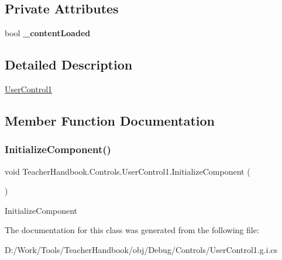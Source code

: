 \subsection*{Private Attributes}
\begin{DoxyCompactItemize}
\item 
\mbox{\label{class_teacher_handbook_1_1_controls_1_1_user_control1_a57070769f7910e144693661a022177be}} 
bool {\bfseries \+\_\+content\+Loaded}
\end{DoxyCompactItemize}


\subsection{Detailed Description}
\mbox{\hyperlink{class_teacher_handbook_1_1_controls_1_1_user_control1}{User\+Control1}} 



\subsection{Member Function Documentation}
\mbox{\label{class_teacher_handbook_1_1_controls_1_1_user_control1_afbcb7046a6000b1f69c161bb9e5c69b2}} 
\subsubsection{\texorpdfstring{Initialize\+Component()}{InitializeComponent()}}
{\footnotesize\ttfamily void Teacher\+Handbook.\+Controls.\+User\+Control1.\+Initialize\+Component (\begin{DoxyParamCaption}{ }\end{DoxyParamCaption})}



Initialize\+Component 



The documentation for this class was generated from the following file\+:\begin{DoxyCompactItemize}
\item 
D\+:/\+Work/\+Tools/\+Teacher\+Handbook/obj/\+Debug/\+Controls/User\+Control1.\+g.\+i.\+cs\end{DoxyCompactItemize}
